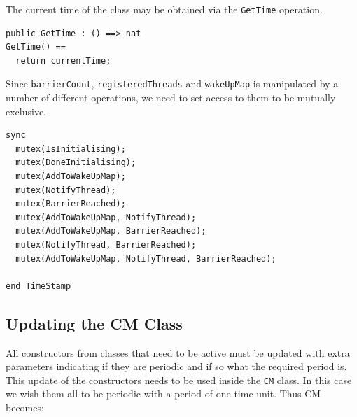 \documentclass{overturerepchap}
\begin{document}
The current time of the class may be obtained via the \texttt{GetTime}
operation.

\begin{lstlisting}
public GetTime : () ==> nat
GetTime() ==
  return currentTime;
\end{lstlisting}

Since \texttt{barrierCount}, \texttt{registeredThreads} and 
\texttt{wakeUpMap} is manipulated by a number of different
operations, we need to set access to them to be mutually exclusive.

\begin{lstlisting}
sync
  mutex(IsInitialising);
  mutex(DoneInitialising);
  mutex(AddToWakeUpMap);
  mutex(NotifyThread);
  mutex(BarrierReached);
  mutex(AddToWakeUpMap, NotifyThread);
  mutex(AddToWakeUpMap, BarrierReached);
  mutex(NotifyThread, BarrierReached);
  mutex(AddToWakeUpMap, NotifyThread, BarrierReached);

end TimeStamp
\end{lstlisting}

\subsection{Updating the CM Class}

All constructors from classes that need to be active must be updated
with extra parameters indicating if they are periodic and if so what
the required period is. This update of the constructors needs to be
used inside the \texttt{CM} class. In this case we wish them all to 
be periodic with a period of one time unit. Thus CM becomes:
\end{document}

